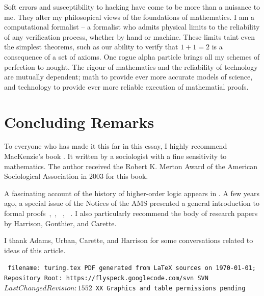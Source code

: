 \documentclass{llncs}
\def\svninfo{{\tt
  filename: turing.tex\hfill\break
  PDF generated from LaTeX sources on \today; \hfill\break
  Repository Root: https://flyspeck.googlecode.com/svn \hfill\break
  SVN $LastChangedRevision: 1552 $
  XX Graphics and table permissions pending
  }
  }
\begin{document}
Soft errors and susceptibility to hacking
have come to be more than a nuisance to me.  They alter my
philosopical views of the foundations of mathematics.  I am a
computational formalist -- a formalist who admits physical
limits to the reliability of any verification process, whether by hand
or machine.  These limits taint even the simplest theorems, such as
our ability to verify that $1+1=2$ is a consequence of a set of
axioms.  One rogue alpha particle brings all my schemes of
perfection to nought.  %
The rigour of
mathematics and the reliability of technology are mutually dependent;
math to provide ever more accurate models of science, and technology
to provide ever more reliable execution of mathematial proofs.

\newpage
\section{Concluding Remarks}


To everyone who has made it this far in this essay,  I
highly recommend MacKenzie's book \cite{Mac}.  It written by a
sociologist with a fine sensitivity to mathematics.  The author
received the Robert K. Merton Award of the American Sociological
Association in 2003 for this book.

A fascinating account of the history of higher-order logic appears in
\cite{Gor}.  A few years ago, a special issue of the Notices of the
AMS presented a general introduction to formal
proofs~\cite{Hales:2008:formal},~\cite{Harrison:2008:formal},
~\cite{gonthier:2008:formal}, ~\cite{Wiedijk:2008:formal}.  I also particularly
recommend the body of research papers by Harrison, Gonthier, and
Carette.



\bigskip

I thank Adams, Urban, Carette, and Harrison 
for some conversations related to ideas of this article.




\raggedright



\bigskip
\noindent
\svninfo
\end{document}
